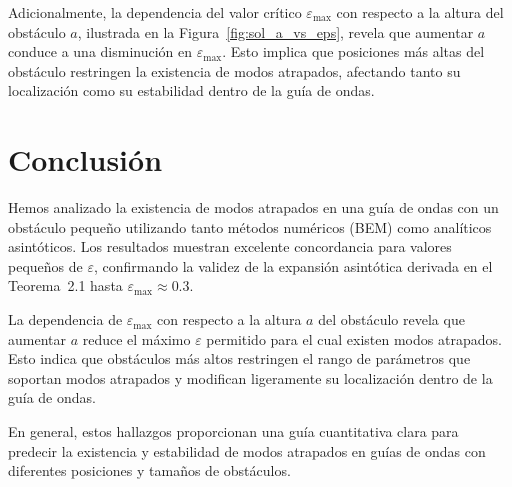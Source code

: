 \documentclass[11pt]{article}
\begin{document}
Adicionalmente, la dependencia del valor crítico $\varepsilon_{\max}$ con respecto a la altura del obstáculo $a$, ilustrada en la Figura~\ref{fig:sol_a_vs_eps}, revela que aumentar $a$ conduce a una disminución en $\varepsilon_{\max}$. Esto implica que posiciones más altas del obstáculo restringen la existencia de modos atrapados, afectando tanto su localización como su estabilidad dentro de la guía de ondas.

\section{Conclusión}

Hemos analizado la existencia de modos atrapados en una guía de ondas con un obstáculo pequeño utilizando tanto métodos numéricos (BEM) como analíticos asintóticos. Los resultados muestran excelente concordancia para valores pequeños de $\varepsilon$, confirmando la validez de la expansión asintótica derivada en el Teorema~2.1 hasta $\varepsilon_{\max} \approx 0.3$.

La dependencia de $\varepsilon_{\max}$ con respecto a la altura $a$ del obstáculo revela que aumentar $a$ reduce el máximo $\varepsilon$ permitido para el cual existen modos atrapados. Esto indica que obstáculos más altos restringen el rango de parámetros que soportan modos atrapados y modifican ligeramente su localización dentro de la guía de ondas.

En general, estos hallazgos proporcionan una guía cuantitativa clara para predecir la existencia y estabilidad de modos atrapados en guías de ondas con diferentes posiciones y tamaños de obstáculos.




\end{document}
